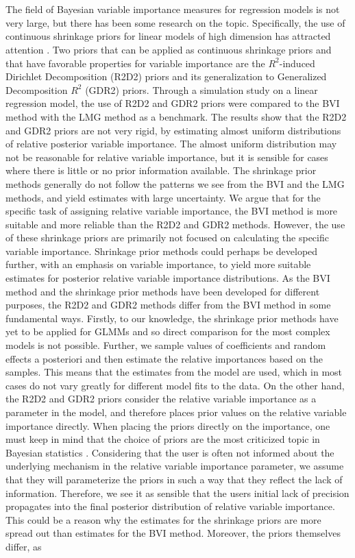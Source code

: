 \\
\\
The field of Bayesian variable importance measures for regression models is not very large, but there has been some research on the topic. Specifically, the use of continuous shrinkage priors for linear models of high dimension has attracted attention \citep{aguilar2024generalized}. Two priors that can be applied as continuous shrinkage priors and that have favorable properties for variable importance are the $R^2$-induced Dirichlet Decomposition (R2D2) priors \citep{zhang2020bayesian} and its generalization to Generalized Decomposition $R^2$ (GDR2) priors. Through a simulation study on a linear regression model, the use of R2D2 and GDR2 priors were compared to the BVI method with the LMG method as a benchmark. The results show that the R2D2 and GDR2 priors are not very rigid, by estimating almost uniform distributions of relative posterior variable importance. The almost uniform distribution may not be reasonable for relative variable importance, but it is sensible for cases where there is little or no prior information available. The shrinkage prior methods generally do not follow the patterns we see from the BVI and the LMG methods, and yield estimates with large uncertainty. We argue that for the specific task of assigning relative variable importance, the BVI method is more suitable and more reliable than the R2D2 and GDR2 methods. However, the use of these shrinkage priors are primarily not focused on calculating the specific variable importance. Shrinkage prior methods could perhaps be developed further, with an emphasis on variable importance, to yield more suitable estimates for posterior relative variable importance distributions. As the BVI method and the shrinkage prior methods have been developed for different purposes, the R2D2 and GDR2 methods differ from the BVI method in some fundamental ways. Firstly, to our knowledge, the shrinkage prior methods have yet to be applied for GLMMs and so direct comparison for the most complex models is not possible. Further, we sample values of coefficients and random effects a posteriori and then estimate the relative importances based on the samples. This means that the estimates from the model are used, which in most cases do not vary greatly for different model fits to the data. On the other hand, the R2D2 and GDR2 priors consider the relative variable importance as a parameter in the model, and therefore places prior values on the relative variable importance directly. When placing the priors directly on the importance, one must keep in mind that the choice of priors are the most criticized topic in Bayesian statistics \citep{robert2007bayesian}. Considering that the user is often not informed about the underlying mechanism in the relative variable importance parameter, we assume that they will parameterize the priors in such a way that they reflect the lack of information. Therefore, we see it as sensible that the users initial lack of precision propagates into the final posterior distribution of relative variable importance. This could be a reason why the estimates for the shrinkage priors are more spread out than estimates for the BVI method. Moreover, the priors themselves differ, as 
